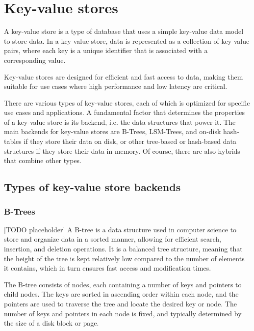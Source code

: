 \section{Key-value stores}

A key-value store is a type of database that uses a simple key-value data model to store data.
In a key-value store, data is represented as a collection of key-value pairs, where each key is a unique identifier that is associated with a corresponding value.

Key-value stores are designed for efficient and fast access to data, making them suitable for use cases where high performance and low latency are critical.

There are various types of key-value stores, each of which is optimized for specific use cases and applications. A fundamental factor that determines the properties of a key-value store is its backend, i.e. the data structures that power it. The main backends for key-value stores are B-Trees, LSM-Trees, and on-disk hash-tables if they store their data on disk, or other tree-based or hash-based data structures if they store their data in memory. Of course, there are also hybrids that combine other types.

\subsection{Types of key-value store backends}

\subsubsection{B-Trees}

[TODO placeholder]
A B-tree is a data structure used in computer science to store and organize data in a sorted manner, allowing for efficient search, insertion, and deletion operations. It is a balanced tree structure, meaning that the height of the tree is kept relatively low compared to the number of elements it contains, which in turn ensures fast access and modification times.

The B-tree consists of nodes, each containing a number of keys and pointers to child nodes. The keys are sorted in ascending order within each node, and the pointers are used to traverse the tree and locate the desired key or node. The number of keys and pointers in each node is fixed, and typically determined by the size of a disk block or page.

